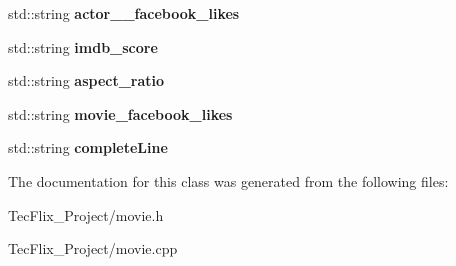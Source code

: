 \begin{DoxyCompactItemize}
\mbox{\label{classmovie_a9a07932968585ae425b05df651afe695}} 
std\+::string {\bfseries actor\+\_\+\_\+facebook\+\_\+likes}
\item 
\mbox{\label{classmovie_a2714dc9430a804faf2df25f7b182ae02}} 
std\+::string {\bfseries imdb\+\_\+score}
\item 
\mbox{\label{classmovie_a0911a97d6dba56fe3fc3c808295dbca4}} 
std\+::string {\bfseries aspect\+\_\+ratio}
\item 
\mbox{\label{classmovie_ad89f86c3df40134cbfeb01a417dd5962}} 
std\+::string {\bfseries movie\+\_\+facebook\+\_\+likes}
\item 
\mbox{\label{classmovie_a7e437b81c1cb3bb69228fcec10402a58}} 
std\+::string {\bfseries complete\+Line}
\end{DoxyCompactItemize}


The documentation for this class was generated from the following files\+:\begin{DoxyCompactItemize}
\item 
Tec\+Flix\+\_\+\+Project/movie.\+h\item 
Tec\+Flix\+\_\+\+Project/movie.\+cpp\end{DoxyCompactItemize}
